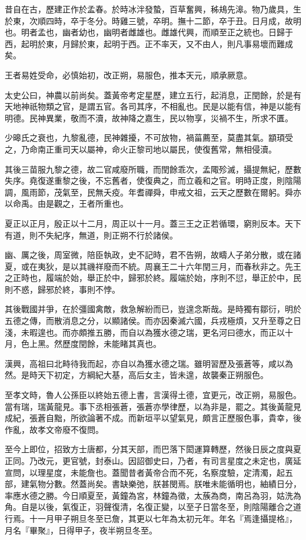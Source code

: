 昔自在古，歷建正作於孟春。於時冰泮發蟄，百草奮興，秭鳺先滜。物乃歲具，生於東，次順四時，卒于冬分。時雞三號，卒明。撫十二節，卒于丑。日月成，故明也。明者孟也，幽者幼也，幽明者雌雄也。雌雄代興，而順至正之統也。日歸于西，起明於東，月歸於東，起明于西。正不率天，又不由人，則凡事易壞而難成矣。

王者易姓受命，必慎始初，改正朔，易服色，推本天元，順承厥意。

太史公曰，神農以前尚矣。蓋黃帝考定星歷，建立五行，起消息，正閏餘，於是有天地神祇物類之官，是謂五官。各司其序，不相亂也。民是以能有信，神是以能有明德。民神異業，敬而不瀆，故神降之嘉生，民以物享，災禍不生，所求不匱。

少暤氏之衰也，九黎亂德，民神雜擾，不可放物，禍菑薦至，莫盡其氣。顓頊受之，乃命南正重司天以屬神，命火正黎司地以屬民，使復舊常，無相侵瀆。

其後三苗服九黎之德，故二官咸廢所職，而閏餘乖次，孟陬殄滅，攝提無紀，歷數失序。堯復遂重黎之後，不忘舊者，使復典之，而立羲和之官。明時正度，則陰陽調，風雨節，茂氣至，民無夭疫。年耆禪舜，申戒文祖，云天之歷數在爾躬。舜亦以命禹。由是觀之，王者所重也。

夏正以正月，殷正以十二月，周正以十一月。蓋三王之正若循環，窮則反本。天下有道，則不失紀序，無道，則正朔不行於諸侯。

幽、厲之後，周室微，陪臣執政，史不記時，君不告朔，故疇人子弟分散，或在諸夏，或在夷狄，是以其禨祥廢而不統。周襄王二十六年閏三月，而春秋非之。先王之正時也，履端於始，舉正於中，歸邪於終。履端於始，序則不愆，舉正於中，民則不惑，歸邪於終，事則不悖。

其後戰國并爭，在於彊國禽敵，救急解紛而已，豈遑念斯哉。是時獨有鄒衍，明於五德之傳，而散消息之分，以顯諸侯。而亦因秦滅六國，兵戎極煩，又升至尊之日淺，未暇遑也。而亦頗推五勝，而自以為獲水德之瑞，更名河曰德水，而正以十月，色上黑。然歷度閏餘，未能睹其真也。

漢興，高祖曰北畤待我而起，亦自以為獲水德之瑞。雖明習歷及張蒼等，咸以為然。是時天下初定，方綱紀大基，高后女主，皆未遑，故襲秦正朔服色。

至孝文時，魯人公孫臣以終始五德上書，言漢得土德，宜更元，改正朔，易服色。當有瑞，瑞黃龍見。事下丞相張蒼，張蒼亦學律歷，以為非是，罷之。其後黃龍見成紀，張蒼自黜，所欲論著不成。而新垣平以望氣見，頗言正歷服色事，貴幸，後作亂，故孝文帝廢不復問。

至今上即位，招致方士唐都，分其天部，而巴落下閎運算轉歷，然後日辰之度與夏正同。乃改元，更官號，封泰山。因詔御史曰，乃者，有司言星度之未定也，廣延宣問，以理星度，未能詹也。蓋聞昔者黃帝合而不死，名察度驗，定清濁，起五部，建氣物分數。然蓋尚矣。書缺樂弛，朕甚閔焉。朕唯未能循明也，紬績日分，率應水德之勝。今日順夏至，黃鐘為宮，林鐘為徵，太蔟為商，南呂為羽，姑洗為角。自是以後，氣復正，羽聲復清，名復正變，以至子日當冬至，則陰陽離合之道行焉。十一月甲子朔旦冬至已詹，其更以七年為太初元年。年名『焉逢攝提格』，月名『畢聚』，日得甲子，夜半朔旦冬至。

